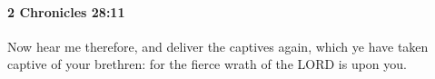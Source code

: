 
		\paragraph{2 Chronicles 28:11} %
			\label{2CHRONICLES-28-11}

			Now hear me therefore, and deliver the captives again, which ye have taken captive of your brethren: for the fierce wrath of the LORD is upon you.


